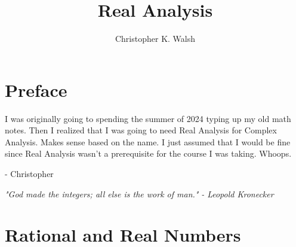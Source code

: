 \documentclass[12pt,openany]{book}
\title{Real Analysis}
\author{Christopher K. Walsh}
\theoremstyle{mydefinitionstyle}
\theoremstyle{myexamplestyle}
\theoremstyle{remark}
\begin{document}
\maketitle
\tableofcontents

\newpage

\chapter*{Preface}

I was originally going to spending the summer of 2024 typing up my old math notes.
Then I realized that I was going to need Real Analysis for Complex Analysis.
Makes sense based on the name.
I just assumed that I would be fine since Real Analysis wasn't a prerequisite for the course I was taking.
Whoops.

- Christopher

\vspace{10mm}
\begin{center}
    \textit{"God made the integers; all else is the work of man."}
    \textit{- Leopold Kronecker}
\end{center}


\chapter{Rational and Real Numbers}



\end{document}
